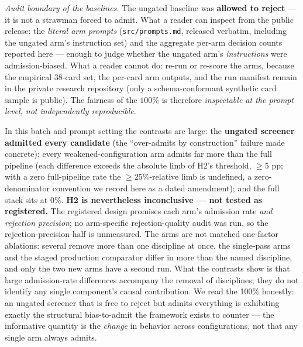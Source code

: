 \documentclass[11pt]{article}
\begin{document}
\noindent\emph{Audit boundary of the baselines.} The ungated baseline was \textbf{allowed to
reject} --- it is not a strawman forced to admit. What a reader can inspect from the public
release: the \emph{literal arm prompts} (\texttt{src/prompts.md}, released verbatim, including the
ungated arm's instruction set) and the aggregate per-arm decision counts reported here --- enough
to judge whether the ungated arm's \emph{instructions} were admission-biased. What a reader cannot
do: re-run or re-score the arms, because the empirical 38-card set, the per-card arm outputs, and
the run manifest remain in the private research repository (only a schema-conformant synthetic
card sample is public). The fairness of the $100\%$ is therefore \emph{inspectable at the prompt
level, not independently reproducible}.

In this batch and prompt setting the contrasts are large: the
\textbf{ungated screener admitted every candidate} (the ``over-admits by construction'' failure made
concrete);
every weakened-configuration arm admits far more than the full pipeline (each difference exceeds
the absolute limb of H2's
threshold, $\geq 5$ pp; with a zero full-pipeline rate the $\geq 25\%$-relative limb is undefined, a
zero-denominator convention we record here as a dated amendment); and the full stack sits at 0\%.
\textbf{H2 is nevertheless inconclusive --- not tested as registered.} The registered design promises
each arm's admission rate \emph{and rejection precision}; no arm-specific rejection-quality audit was
run, so the rejection-precision half is unmeasured. The arms are not matched one-factor ablations:
several remove more than one discipline at once, the single-pass arms and the staged production
comparator differ in more than the named discipline, and only the two new arms have a second run.
What the contrasts show is that large admission-rate differences accompany the removal of
disciplines; they do not identify any single component's causal contribution.
We read the 100\% honestly: an ungated screener that is free to reject but admits
everything is exhibiting exactly the structural bias-to-admit the framework
exists to counter --- the informative quantity is the \emph{change} in behavior
across configurations, not that any single arm always admits.
\end{document}
